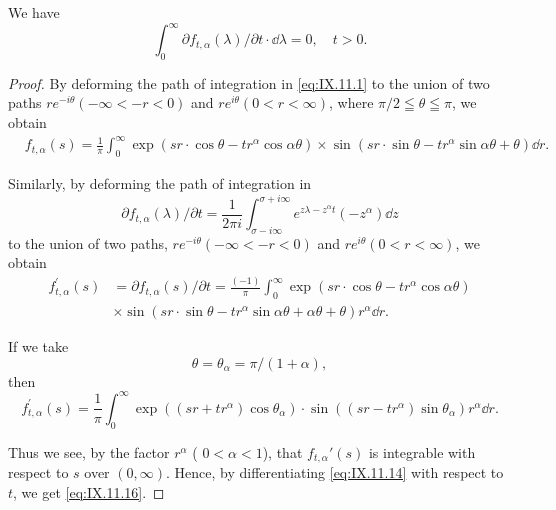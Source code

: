 \begin{proposition}\label{prop:IX.11.Proposition.4} We have 
\begin{equation}\label{eq:IX.11.16}
\int_{0} ^{\infty} \partial f _{t, \alpha} (\lambda) / \partial t \cdot \dd \lambda = 0, \quad t > 0.
\end{equation}
\end{proposition}

\begin{proof}
 By deforming the path of integration in \eqref{eq:IX.11.1} to the union of two paths $re^{-i\theta}(-\infty<-r<0)$ and $re^{i\theta}(0<r<\infty)$, where $\pi/2\leqq\theta\leqq\pi$, we obtain 
\begin{equation}\label{eq:IX.11.17}
\begin{aligned}
&f _{t, \alpha} (s) = \frac {1}{\pi} \int_{0} ^{\infty} \exp (s r \cdot \cos \theta - t r ^{\alpha} \cos \alpha \theta) \times \sin (s r \cdot \sin \theta - t r ^{\alpha} \sin \alpha \theta + \theta) \dd r.
\end{aligned}
\end{equation}

Similarly, by deforming the path of integration in 
\[
\partial f _{t, \alpha} (\lambda) / \partial t = \frac {1}{2 \pi i} \int_{\sigma - i \infty} ^{\sigma + i \infty} e ^ {z \lambda - z ^{\alpha} t} (- z ^{\alpha}) \dd z
\]
to the union of two paths, $re^{-i\theta}(-\infty < -r < 0)$ and $re^{i\theta}(0 < r < \infty)$, we obtain 
\begin{equation}\label{eq:IX.11.18}
\begin{aligned} f _{t, \alpha} ^{\prime} (s) & = \partial f _{t, \alpha} (s) / \partial t = \frac {(- 1)}{\pi} \int_{0} ^{\infty} \exp (s r \cdot \cos \theta - t r ^{\alpha} \cos \alpha \theta) \\ & \times \sin (s r \cdot \sin \theta - t r ^{\alpha} \sin \alpha \theta + \alpha \theta + \theta) r ^{\alpha} \dd r. \end{aligned}
\end{equation}

If we take 
\[
\theta = \theta_{\alpha} = \pi / (1 + \alpha),
\]
then 
\begin{equation}\label{eq:IX.11.19}
f _{t, \alpha} ^{\prime} (s) = \frac {1}{\pi} \int_{0} ^{\infty} \exp \left((s r + t r ^{\alpha}) \cos \theta_{\alpha}\right) \cdot \sin \left((s r - t r ^{\alpha}) \sin \theta_{\alpha}\right) r ^{\alpha} \dd r.
\end{equation}

Thus we see, by the factor $r^{\alpha}$ ( $0 < \alpha < 1$), that $f_{t,\alpha}'(s)$ is integrable with respect to $s$ over $(0, \infty)$. Hence, by differentiating \eqref{eq:IX.11.14} with respect to $t$, we get \eqref{eq:IX.11.16}. 
\end{proof}

